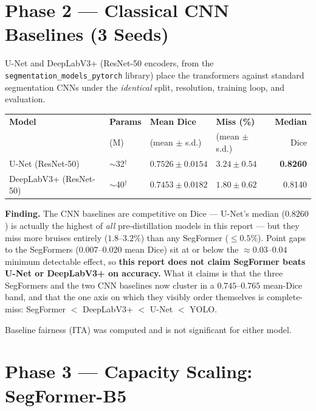 \documentclass[11pt]{article}
\newcommand{\tabnote}[1]{\par\vspace{2pt}{\footnotesize\itshape #1}\par}
\begin{document}
\section{Phase 2 --- Classical CNN Baselines (3 Seeds)}

U-Net and DeepLabV3+ (ResNet-50 encoders, from the
\texttt{segmentation\_models\_pytorch} library) place the transformers against standard
segmentation CNNs under the \emph{identical} split, resolution, training loop, and evaluation.

\begin{center}\small
\begin{tabular}{L M M M n}
\toprule
\textbf{Model} & \textbf{Params} & \textbf{Mean Dice} & \textbf{Miss (\%)} & \textbf{Median} \\
 & (M) & (mean $\pm$ s.d.) & (mean $\pm$ s.d.) & Dice \\
\midrule
U-Net (ResNet-50)      & $\sim$32$^\dagger$ & $0.7526\pm0.0154$ & $3.24\pm0.54$ & \textbf{0.8260} \\
DeepLabV3+ (ResNet-50) & $\sim$40$^\dagger$ & $0.7453\pm0.0182$ & $1.80\pm0.62$ & 0.8140 \\
\bottomrule
\end{tabular}
\end{center}

\tabnote{$^\dagger$ Nominal encoder-based parameter estimates; not measured in this project's
benchmark harness (unlike the SegFormer/YOLO counts in \S5.9, which are).}

\textbf{Finding.} The CNN baselines are competitive on Dice --- U-Net's median ($0.8260$) is
actually the highest of \emph{all} pre-distillation models in this report --- but they miss more
bruises entirely ($1.8$--$3.2\%$) than any SegFormer ($\le0.5\%$). Point gaps to the SegFormers
($0.007$--$0.020$ mean Dice) sit at or below the $\approx0.03$--$0.04$ minimum detectable effect,
so \textbf{this report does not claim SegFormer beats U-Net or DeepLabV3+ on accuracy.} What it
claims is that the three SegFormers and the two CNN baselines now cluster in a
$0.745$--$0.765$ mean-Dice band, and that the
one axis on which they visibly order themselves is complete-miss:
SegFormer $<$ DeepLabV3+ $<$ U-Net $<$ YOLO.

Baseline fairness (ITA) was computed and is not significant for either model.

\section{Phase 3 --- Capacity Scaling: SegFormer-B5}
\end{document}
